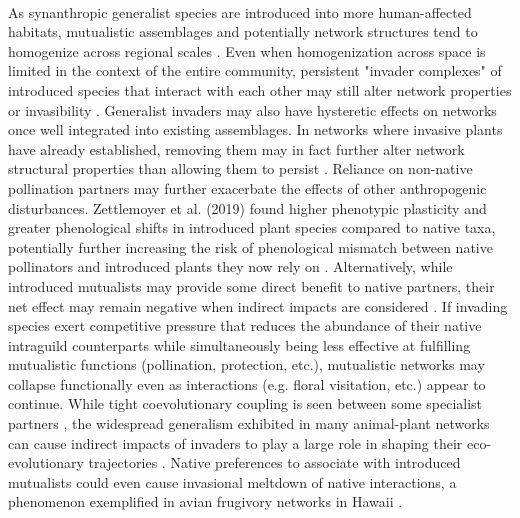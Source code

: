     \paragraph{} %
    As synanthropic generalist species are introduced into more human-affected habitats, mutualistic assemblages and potentially network structures tend to homogenize across regional scales \parencite{fricke2020accelerating}. Even when homogenization across space is limited in the context of the entire community, persistent "invader complexes" of introduced species that interact with each other may still alter network properties or invasibility \parencite{richardson2000plant, prior2015mutualism, vollstadt2022plant}. Generalist invaders may also have hysteretic effects on networks once well integrated into existing assemblages. In networks where invasive plants have already established, removing them may in fact further alter network structural properties than allowing them to persist \parencite{valdovinos2009structure, aslan2019implications}. Reliance on non-native pollination partners may further exacerbate the effects of other anthropogenic disturbances. Zettlemoyer et al. (2019) found higher phenotypic plasticity and greater phenological shifts in introduced plant species compared to native taxa, potentially further increasing the risk of phenological mismatch between native pollinators and introduced plants they now rely on \parencite{zettlemoyer2019phenology}. Alternatively, while introduced mutualists may provide some direct benefit to native partners, their net effect may remain negative when indirect impacts are considered \parencite{vidal2021variable}. If invading species exert competitive pressure that reduces the abundance of their native intraguild counterparts while simultaneously being less effective at fulfilling mutualistic functions (pollination, protection, etc.), mutualistic networks may collapse functionally even as interactions (e.g. floral visitation, etc.) appear to continue. While tight coevolutionary coupling is seen between some specialist partners \parencite{stebbins1970adaptive}, the widespread generalism exhibited in many animal-plant networks can cause indirect impacts of invaders to play a large role in shaping their eco-evolutionary trajectories \parencite{guimaraes2017indirect, medeiros2018geographic}. Native preferences to associate with introduced mutualists could even cause invasional meltdown of native interactions, a phenomenon exemplified in avian frugivory networks in Hawaii \parencite{VizentinBugoni2021}.


